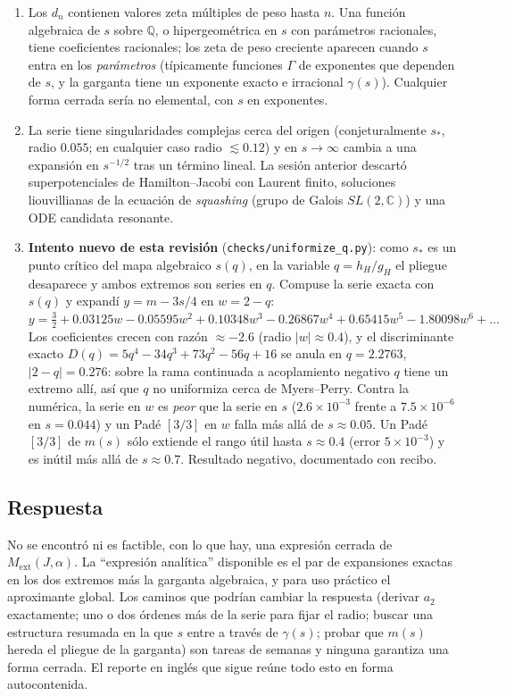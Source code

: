 \documentclass[10pt,a4paper]{article}
\newcommand{\code}[1]{\texttt{#1}}
\newcommand{\ext}{\mathrm{ext}}
\begin{document}
\begin{enumerate}
\item Los $d_n$ contienen valores zeta múltiples de peso hasta $n$. Una función algebraica de $s$
 sobre $\mathbb Q$, o hipergeométrica en $s$ con parámetros racionales, tiene coeficientes
 racionales; los zeta de peso creciente aparecen cuando $s$ entra en los \emph{parámetros}
 (típicamente funciones $\Gamma$ de exponentes que dependen de $s$, y la garganta tiene un exponente
 exacto e irracional $\gamma(s)$). Cualquier forma cerrada sería no elemental, con $s$ en exponentes.
\item La serie tiene singularidades complejas cerca del origen (conjeturalmente $s_*$, radio
 $0.055$; en cualquier caso radio $\lesssim0.12$) y en $s\to\infty$ cambia a una expansión en
 $s^{-1/2}$ tras un término lineal. La sesión anterior descartó superpotenciales de
 Hamilton--Jacobi con Laurent finito, soluciones liouvillianas de la ecuación de \emph{squashing}
 (grupo de Galois $SL(2,\mathbb C)$) y una ODE candidata resonante.
\item \textbf{Intento nuevo de esta revisión} (\code{checks/uniformize\_q.py}): como $s_*$ es un
 punto crítico del mapa algebraico $s(q)$, en la variable $q=h_H/g_H$ el pliegue desaparece y ambos
 extremos son series en $q$. Compuse la serie exacta con $s(q)$ y expandí $y=m-3s/4$ en $w=2-q$:
 $y=\tfrac32+0.03125w-0.05595w^2+0.10348w^3-0.26867w^4+0.65415w^5-1.80098w^6+\dots$ Los
 coeficientes crecen con razón $\approx-2.6$ (radio $|w|\approx0.4$), y el discriminante exacto
 $D(q)=5q^4-34q^3+73q^2-56q+16$ se anula en $q=2.2763$, $|2-q|=0.276$: sobre la rama continuada a
 acoplamiento negativo $q$ tiene un extremo allí, así que $q$ no uniformiza cerca de Myers--Perry.
 Contra la numérica, la serie en $w$ es \emph{peor} que la serie en $s$ ($2.6\times10^{-3}$ frente a
 $7.5\times10^{-6}$ en $s=0.044$) y un Padé $[3/3]$ en $w$ falla más allá de $s\approx0.05$. Un Padé
 $[3/3]$ de $m(s)$ sólo extiende el rango útil hasta $s\approx0.4$ (error $5\times10^{-3}$) y es
 inútil más allá de $s\approx0.7$. Resultado negativo, documentado con recibo.
\end{enumerate}

\subsection{Respuesta}

No se encontró ni es factible, con lo que hay, una expresión cerrada de $M_\ext(J,\alpha)$. La
``expresión analítica'' disponible es el par de expansiones exactas en los dos extremos más la
garganta algebraica, y para uso práctico el aproximante global. Los caminos que podrían cambiar la
respuesta (derivar $a_2$ exactamente; uno o dos órdenes más de la serie para fijar el radio;
buscar una estructura resumada en la que $s$ entre a través de $\gamma(s)$; probar que $m(s)$ hereda
el pliegue de la garganta) son tareas de semanas y ninguna garantiza una forma cerrada. El reporte
en inglés que sigue reúne todo esto en forma autocontenida.
\end{document}
